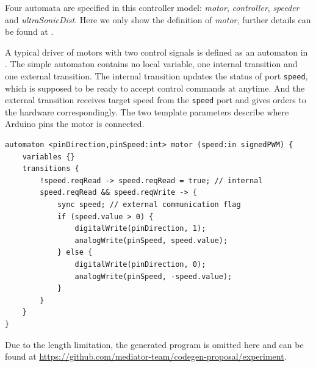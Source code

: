 Four \lang{} automata are specified in this controller model: \emph{motor}, \emph{controller}, \emph{speeder} and \emph{ultraSonicDist}. Here we only show the definition of \emph{motor}, further details can be found at \cite{medgit}.

    A typical driver of motors with two control signals is defined as an automaton in \lang{}. The simple automaton contains no local variable, one internal transition and one external transition. The internal transition updates the status of port \texttt{speed}, which is supposed to be ready to accept control commands at anytime. And the external transition receives target speed from the \texttt{speed} port and gives orders to the hardware correspondingly. The two template parameters describe where Arduino pins the motor is connected.
    \begin{lstlisting}
automaton <pinDirection,pinSpeed:int> motor (speed:in signedPWM) {
    variables {}
    transitions {
        !speed.reqRead -> speed.reqRead = true; // internal
        speed.reqRead && speed.reqWrite -> {
            sync speed; // external communication flag
            if (speed.value > 0) {
                digitalWrite(pinDirection, 1);
                analogWrite(pinSpeed, speed.value);
            } else {
                digitalWrite(pinDirection, 0);
                analogWrite(pinSpeed, -speed.value);
            }
        }
    }
}
    \end{lstlisting}


Due to the length limitation, the generated program is omitted here and can be found at \url{https://github.com/mediator-team/codegen-proposal/experiment}.